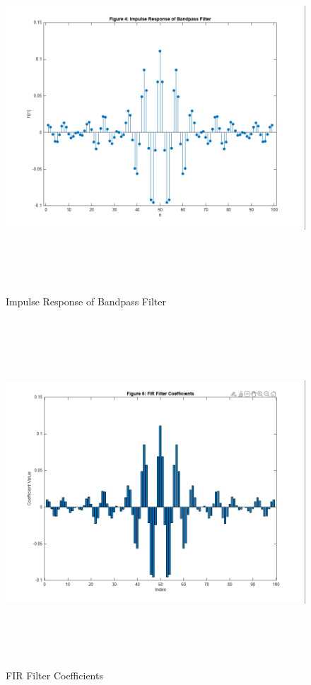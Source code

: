 \documentclass[12pt]{article}
\begin{document}
\begin{figure}[H]
    \centering
    \includegraphics[height=13cm]{g14.png}
    \caption{Impulse Response of Bandpass Filter}
    \label{fig:impulse_response}
\end{figure}

\begin{figure}[H]
    \centering
    \includegraphics[height=13cm]{g15.png}
    \caption{FIR Filter Coefficients}
    \label{fig:coefficients}
\end{figure}
\end{document}
